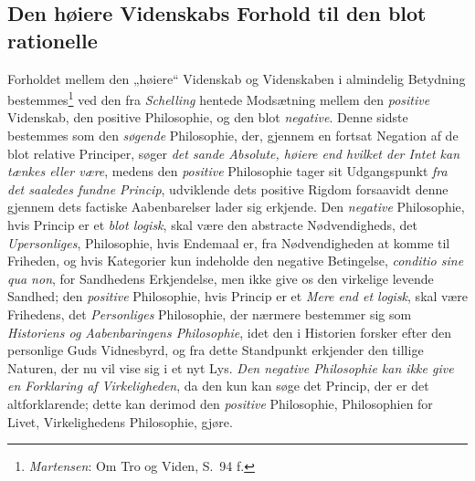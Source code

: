 \documentclass[12pt,a4paper]{book}
\begin{document}
\subsection{Den høiere Videnskabs Forhold til den blot rationelle}
\label{ssec:hoiere-videnskab}

Forholdet mellem den „høiere“ Videnskab og Videnskaben i almindelig Betydning
bestemmes\footnote{\emph{Martensen}: Om Tro og Viden, S.\ 94 f.} ved den fra \emph{Schelling}
hentede Modsætning mellem den \emph{positive} Videnskab, den positive Philosophie, og den
blot \emph{negative}. Denne sidste bestemmes som den \emph{søgende} Philosophie, der, gjennem en
fortsat Negation af de blot relative Principer, søger \emph{det sande Absolute, høiere end
hvilket der Intet kan tænkes eller være}, medens den \emph{positive} Philosophie tager sit
Udgangspunkt \emph{fra det saaledes fundne Princip}, udviklende dets positive Rigdom
forsaavidt denne gjennem dets factiske Aabenbarelser lader sig erkjende. Den \emph{negative} Philosophie, hvis Princip er et \emph{blot logisk}, skal være den abstracte Nødvendigheds, det \emph{Upersonliges}, Philosophie, hvis Endemaal er, fra Nødvendigheden at komme til
Friheden, og hvis Kategorier kun indeholde den negative Betingelse, \textit{conditio sine
qua non}, for Sandhedens Erkjendelse, men ikke give os den virkelige levende Sandhed; den
\emph{positive} Philosophie, hvis Princip er et \emph{Mere end et logisk}, skal være
Frihedens, det \emph{Personliges} Philosophie, der nærmere bestemmer sig som
\emph{Historiens og Aabenbaringens Philosophie}, idet den i Historien forsker efter den
personlige Guds Vidnesbyrd, og fra dette Standpunkt erkjender den tillige Naturen, der nu
vil vise sig i et nyt Lys. \emph{Den negative Philosophie kan ikke give en Forklaring af
Virkeligheden}, da den kun kan søge det Princip, der er det altforklarende; dette kan
derimod den \emph{positive} Philosophie, Philosophien for Livet, Virkelighedens Philosophie,
gjøre.
\end{document}

